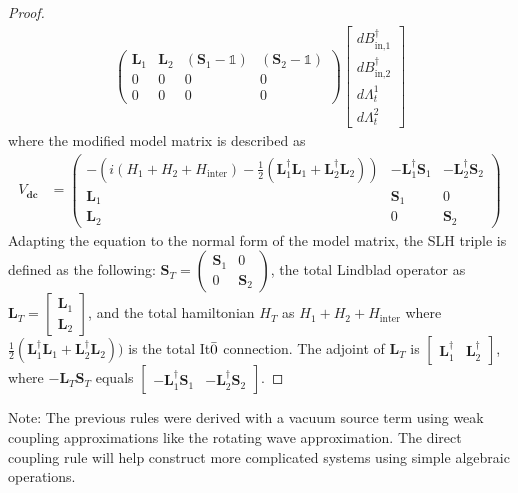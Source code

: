 \documentclass[a4paper]{article}
\theoremstyle{definition}
\begin{document}
\begin{enumerate}[label=(\roman*)]
\begin{proof}
\begin{align}
\begin{pmatrix}
    \textbf{L}_1 & \textbf{L}_2 & (\textbf{S}_1-\mathbb{1}) & (\textbf{S}_2-\mathbb{1}) \\
    0 & 0 & 0 & 0 \\
    0 & 0 & 0 & 0
    \end{pmatrix}
    \begin{bmatrix}
    dB^\dagger_\text{in,1} \\
    dB^\dagger_\text{in,2} \\
    d\Lambda^1_t \\
    d\Lambda^2_t
    \end{bmatrix}
\end{align}
where the modified model matrix is described as 
\begin{align}
    V_{\textbf{dc}} & =  \begin{pmatrix}
     -(i(H_1 + H_2 + H_{\text{inter}}) - \frac{1}{2}(\textbf{L}_1^\dagger \textbf{L}_1 + \textbf{L}_2^\dagger \textbf{L}_2)) & - \textbf{L}_1^\dagger \textbf{S}_1 & - \textbf{L}_2^\dagger \textbf{S}_2 \\
     \textbf{L}_1 & \textbf{S}_1 & 0 \\
     \textbf{L}_2 & 0 & \textbf{S}_2
    \end{pmatrix}
\end{align}
Adapting the equation to the normal form of the model matrix, the SLH triple is defined as the following:  $\textbf{S}_T = \begin{pmatrix}
\textbf{S}_1 & 0 \\
0 & \textbf{S}_2
\end{pmatrix}$, the total Lindblad operator as 
$\textbf{L}_T = \begin{bmatrix}
\textbf{L}_1 \\
\textbf{L}_2
\end{bmatrix}$, and the total hamiltonian $H_T$ as $H_1 + H_2 + H_{\text{inter}}$ where $\frac{1}{2}(\textbf{L}_1^\dagger \textbf{L}_1 + \textbf{L}_2^\dagger \textbf{L}_2))$ is the total It$\Bar{0}$ connection. The adjoint of $\textbf{L}_T$ is $\begin{bmatrix}
\textbf{L}^\dagger_1 & \textbf{L}^\dagger_2
\end{bmatrix}$, where $-\textbf{L}_T\textbf{S}_T$ equals $\begin{bmatrix}
-\textbf{L}^\dagger_1\textbf{S}_1 & -\textbf{L}^\dagger_2 \textbf{S}_2
\end{bmatrix}$.
\end{proof}
Note: The previous rules were derived with a vacuum source term using weak coupling approximations like the rotating wave approximation. The direct coupling rule will help construct more complicated systems using simple algebraic operations.
\end{enumerate}
\end{document}
